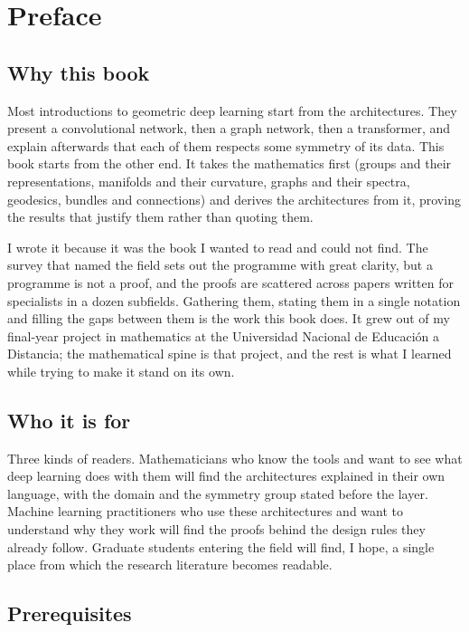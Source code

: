 \chapter*{Preface}

\section*{Why this book}

Most introductions to geometric deep learning start from the architectures. They present a convolutional network, then a graph network, then a transformer, and explain afterwards that each of them respects some symmetry of its data. This book starts from the other end. It takes the mathematics first (groups and their representations, manifolds and their curvature, graphs and their spectra, geodesics, bundles and connections) and derives the architectures from it, proving the results that justify them rather than quoting them.

I wrote it because it was the book I wanted to read and could not find. The survey that named the field \citep{DBLP:journals/corr/abs-2104-13478} sets out the programme with great clarity, but a programme is not a proof, and the proofs are scattered across papers written for specialists in a dozen subfields. Gathering them, stating them in a single notation and filling the gaps between them is the work this book does. It grew out of my final-year project in mathematics at the Universidad Nacional de Educación a Distancia; the mathematical spine is that project, and the rest is what I learned while trying to make it stand on its own.

\section*{Who it is for}

Three kinds of readers. Mathematicians who know the tools and want to see what deep learning does with them will find the architectures explained in their own language, with the domain and the symmetry group stated before the layer. Machine learning practitioners who use these architectures and want to understand why they work will find the proofs behind the design rules they already follow. Graduate students entering the field will find, I hope, a single place from which the research literature becomes readable.

\section*{Prerequisites}

